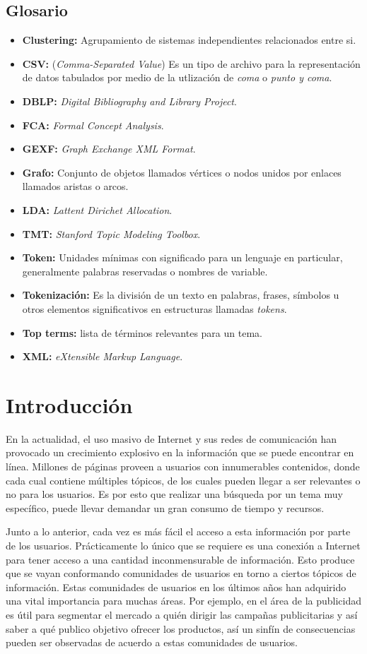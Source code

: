 \documentclass[12pt,oneside,letterpaper]{book}
\newcommand{\gli}[2]{\item{\textbf{#1:} #2}} %
\newcommand{\eng}[1]{\textit{#1}\xspace}			%
\theoremstyle{definition}
\begin{document}
\section*{Glosario}
\thispagestyle{empty}
\begin{itemize}
	\gli{Clustering}{Agrupamiento de sistemas independientes relacionados entre si.}
	\gli{CSV}{(\eng{Comma-Separated Value}) Es un tipo de archivo para la representación de datos tabulados por medio de la utlización de \eng{coma} o \eng{punto y coma}.}
	\gli{DBLP}{\eng{Digital Bibliography and Library Project}.}
	\gli{FCA}{\eng{Formal Concept Analysis}.}
	\gli{GEXF}{\eng{Graph Exchange XML Format}.}
	\gli{Grafo}{Conjunto de objetos llamados vértices o nodos unidos por enlaces llamados aristas o arcos.}
	\gli{LDA}{\eng{Lattent Dirichet Allocation}.}
	\gli{TMT}{\eng{Stanford Topic Modeling Toolbox}.}
	\gli{Token}{Unidades mínimas con significado para un lenguaje en particular, generalmente palabras reservadas o nombres de variable.}
	\gli{Tokenización}{Es la división de un texto en palabras, frases, símbolos u otros elementos significativos en estructuras llamadas \eng{tokens}.}
	\gli{Top terms}{lista de términos relevantes para un tema.}
	\gli{XML}{\eng{eXtensible Markup Language}.}
\end{itemize}
\clearpage

\pagestyle{plain2}
\tableofcontents
\clearpage
\endgroup

\pagestyle{fancy}
\setcounter{page}{1}
\chapter{Introducción}
En la actualidad, el uso masivo de Internet y sus redes de comunicación han provocado un crecimiento explosivo en la información que se puede encontrar en línea. Millones de páginas proveen a usuarios con innumerables contenidos, donde cada cual contiene múltiples tópicos, de los cuales pueden llegar a ser relevantes o no para los usuarios. Es por esto que realizar una búsqueda por un tema muy específico, puede llevar demandar un gran consumo de tiempo y recursos.

Junto a lo anterior, cada vez es más fácil el acceso a esta información por parte de los usuarios. Prácticamente lo único que se requiere es una conexión a Internet para tener acceso a una cantidad inconmensurable de información. Esto produce que se vayan conformando comunidades de usuarios en torno a ciertos tópicos de información. Estas comunidades de usuarios en los últimos años han adquirido una vital importancia para muchas áreas. Por ejemplo, en el área de la publicidad es útil para segmentar el mercado a quién dirigir las campañas publicitarias y así saber a qué publico objetivo ofrecer los productos, así un sinfín de consecuencias pueden ser observadas de acuerdo a estas comunidades de usuarios.
\end{document}
